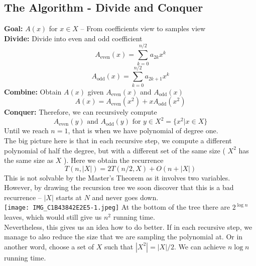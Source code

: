 \documentclass[a4paper]{article}
\renewcommand{\sb}{\vspace*{4px} \\}
\begin{document}
\subsection{The Algorithm - Divide and Conquer}
\textbf{Goal:} $A(x)$ for $x \in X$ -- From coefficients view to samples view \sb
\textbf{Divide:} Divide into even and odd coefficient
\[ A_{\text{even}}(x) = \sum_{k=0}^{n/2}a_{2k}x^k \]
\[ A_{\text{odd}}(x) = \sum_{k=0}^{n/2}a_{2k+1}x^k \]
\textbf{Combine:} Obtain $A(x)$ given $A_{\text{even}}(x)$ and $A_{\text{odd}}(x)$
\[ A(x) = A_{\text{even}}(x^2) + xA_{\text{odd}}(x^2) \]
\textbf{Conquer:} Therefore, we can recursively compute
\[ A_{\text{even}}(y) \text{ and } A_{\text{odd}}(y) \text{ for } y \in X^2 = \{x^2 | x \in X\} \]
Until we reach $n = 1$, that is when we have polynomial of degree one. \sb
The big picture here is that in each recursive step, we compute a different polynomial of half the degree, 
but with a different set of the same size ( $X^2$ has the same size as $X$ ). Here we obtain the recurrence
\[ T(n, |X|) = 2 T(n/2, X) + O(n + |X|) \]
This is not solvable by the Master's Theorem as it involves two variables. However, by drawing the recursion tree we soon discover that 
this is a bad recurrence -- $|X|$ starts at $N$ and never goes down. \sb
\texttt{[image: IMG\_C1B43842E2E5-1.jpeg]}
At the bottom of the tree there are $2^{\log n}$ leaves, which would still give us $n^2$ running time. \sb
Nevertheless, this gives us an idea how to do better. If in each recursive step, we manage to also reduce the size that we are sampling the 
polynomial at. Or in another word, choose a set of $X$ such that $ |X^2| = |X| / 2$. We can achieve $n \log n$ running time.
\end{document}
